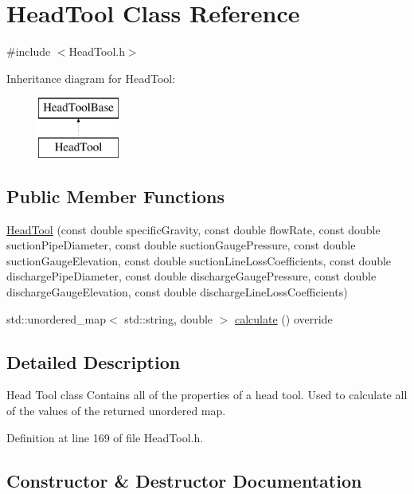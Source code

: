 \hypertarget{class_head_tool}{}\section{Head\+Tool Class Reference}
\label{class_head_tool}


{\ttfamily \#include $<$Head\+Tool.\+h$>$}

Inheritance diagram for Head\+Tool\+:\begin{figure}[H]
\begin{center}
\leavevmode
\includegraphics[height=2.000000cm]{d1/d4f/class_head_tool}
\end{center}
\end{figure}
\subsection*{Public Member Functions}
\begin{DoxyCompactItemize}
\item 
\hyperlink{class_head_tool_a9934c87c8f8eb515ff32e46c74004c0e}{Head\+Tool} (const double specific\+Gravity, const double flow\+Rate, const double suction\+Pipe\+Diameter, const double suction\+Gauge\+Pressure, const double suction\+Gauge\+Elevation, const double suction\+Line\+Loss\+Coefficients, const double discharge\+Pipe\+Diameter, const double discharge\+Gauge\+Pressure, const double discharge\+Gauge\+Elevation, const double discharge\+Line\+Loss\+Coefficients)
\item 
std\+::unordered\+\_\+map$<$ std\+::string, double $>$ \hyperlink{class_head_tool_ab107e7717df4ca95404ce1952c21a84e}{calculate} () override
\end{DoxyCompactItemize}


\subsection{Detailed Description}
Head Tool class Contains all of the properties of a head tool. Used to calculate all of the values of the returned unordered map. 

Definition at line 169 of file Head\+Tool.\+h.



\subsection{Constructor \& Destructor Documentation}
\mbox{\label{class_head_tool_a9934c87c8f8eb515ff32e46c74004c0e}} 
